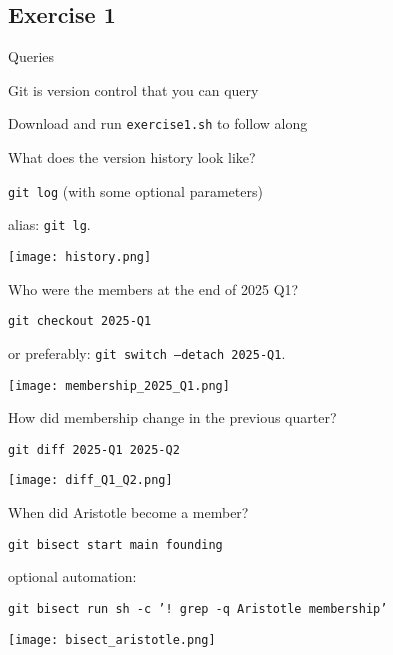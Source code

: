 \documentclass{beamer}
\begin{document}
\subsection{Exercise 1}

\begin{frame}{Queries}
    \begin{center}
        \huge Git is version control that you can query
    \end{center}
    \vfill
    \centering
    \small{Download and run \texttt{exercise1.sh} to follow along}
\end{frame}

\begin{frame}
    \centering
    \Large What does the version history look like?

    \pause
    \vspace{\baselineskip}
    \small{\texttt{git log} (with some optional parameters)

    alias: \texttt{git lg}.}

    \vspace{\baselineskip}
    \texttt{[image: history.png]}
\end{frame}

\begin{frame}
    \centering
    \Large Who were the members at the end of 2025 Q1?

    \pause
    \vspace{\baselineskip}
    \small{\texttt{git checkout 2025-Q1}

    or preferably: \texttt{git switch --detach 2025-Q1}.}

    \vspace{\baselineskip}
    \texttt{[image: membership\_2025\_Q1.png]}
\end{frame}

\begin{frame}
    \centering
    \Large How did membership change in the previous quarter?

    \pause
    \vspace{\baselineskip}
    \small{\texttt{git diff 2025-Q1 2025-Q2}}

    \vspace{\baselineskip}
    \texttt{[image: diff\_Q1\_Q2.png]}
\end{frame}

\begin{frame}
    \centering
    \Large When did Aristotle become a member?

    \pause
    \vspace{\baselineskip}
    \small{\texttt{git bisect start main founding}

    \vspace{\baselineskip}
    optional automation:

    \texttt{git bisect run sh -c '! grep -q Aristotle membership'}}

    \vspace{\baselineskip}
    \texttt{[image: bisect\_aristotle.png]}
\end{frame}
\end{document}
